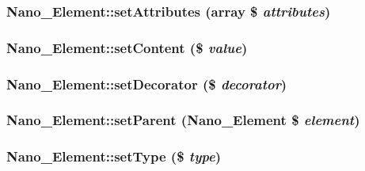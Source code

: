 \hypertarget{classNano__Element_9df5d74de5bca50f4bc1accea9115a72}{
\subsubsection[{setAttributes}]{\setlength{\rightskip}{0pt plus 5cm}Nano\_\-Element::setAttributes (array \$ {\em attributes})}}
\label{classNano__Element_9df5d74de5bca50f4bc1accea9115a72}


\hypertarget{classNano__Element_980d19959ac9226ef6acd52e45981b10}{
\subsubsection[{setContent}]{\setlength{\rightskip}{0pt plus 5cm}Nano\_\-Element::setContent (\$ {\em value})}}
\label{classNano__Element_980d19959ac9226ef6acd52e45981b10}


\hypertarget{classNano__Element_d3ff42c129e9e3ea9c13b837580d2065}{
\subsubsection[{setDecorator}]{\setlength{\rightskip}{0pt plus 5cm}Nano\_\-Element::setDecorator (\$ {\em decorator})}}
\label{classNano__Element_d3ff42c129e9e3ea9c13b837580d2065}


\hypertarget{classNano__Element_537cf639f9d4b8a0fb23bdd985a49d5c}{
\subsubsection[{setParent}]{\setlength{\rightskip}{0pt plus 5cm}Nano\_\-Element::setParent ({\bf Nano\_\-Element} \$ {\em element})}}
\label{classNano__Element_537cf639f9d4b8a0fb23bdd985a49d5c}


\hypertarget{classNano__Element_9da93bea03707e2dd3ad66d59fd123cc}{
\subsubsection[{setType}]{\setlength{\rightskip}{0pt plus 5cm}Nano\_\-Element::setType (\$ {\em type})}}
\label{classNano__Element_9da93bea03707e2dd3ad66d59fd123cc}


